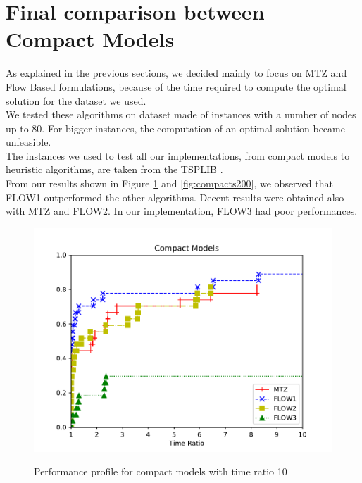 \section{Final comparison between Compact Models}
As explained in the previous sections, we decided mainly to focus on MTZ and Flow Based formulations, because of the time required to compute the optimal solution for the dataset we used.\\
We tested these algorithms on dataset made of instances with a number of nodes up to 80. For bigger instances, the computation of an optimal solution became unfeasible.\\
The instances we used to test all our implementations, from compact models to heuristic algorithms, are taken from the TSPLIB \cite{tsplib}. \\
From our results shown in Figure \ref{fig:compacts10} and \ref{fig:compacts200}, we observed that FLOW1 outperformed the other algorithms. Decent results were obtained also with MTZ and FLOW2. In our implementation, FLOW3 had poor performances.

\begin{figure}[H]
\centering
	\includegraphics[scale=0.9]{media/compact10.pdf} \\
	\caption{Performance profile for compact models with time ratio 10}
	\label{fig:compacts10}
\end{figure}

